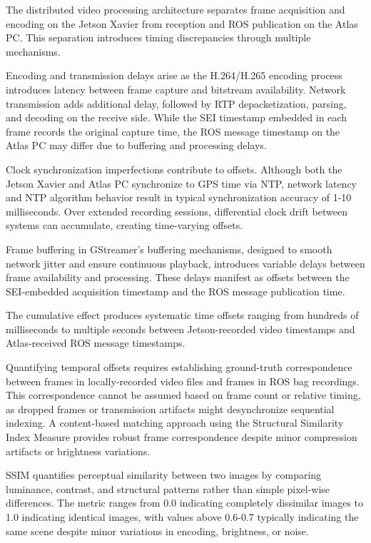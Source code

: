 \documentclass{erauthesis}
\begin{document}

The distributed video processing architecture separates frame acquisition and encoding on the Jetson Xavier from reception and ROS publication on the Atlas PC.
This separation introduces timing discrepancies through multiple mechanisms.

Encoding and transmission delays arise as the H.264/H.265 encoding process introduces latency between frame capture and bitstream availability.
Network transmission adds additional delay, followed by RTP depacketization, parsing, and decoding on the receive side.
While the SEI timestamp embedded in each frame records the original capture time, the ROS message timestamp on the Atlas PC may differ due to buffering and processing delays.

Clock synchronization imperfections contribute to offsets.
Although both the Jetson Xavier and Atlas PC synchronize to GPS time via NTP, network latency and NTP algorithm behavior result in typical synchronization accuracy of 1-10 milliseconds.
Over extended recording sessions, differential clock drift between systems can accumulate, creating time-varying offsets.

Frame buffering in GStreamer's buffering mechanisms, designed to smooth network jitter and ensure continuous playback, introduces variable delays between frame availability and processing.
These delays manifest as offsets between the SEI-embedded acquisition timestamp and the ROS message publication time.

The cumulative effect produces systematic time offsets ranging from hundreds of milliseconds to multiple seconds between Jetson-recorded video timestamps and Atlas-received ROS message timestamps.


Quantifying temporal offsets requires establishing ground-truth correspondence between frames in locally-recorded video files and frames in ROS bag recordings.
This correspondence cannot be assumed based on frame count or relative timing, as dropped frames or transmission artifacts might desynchronize sequential indexing.
A content-based matching approach using the Structural Similarity Index Measure provides robust frame correspondence despite minor compression artifacts or brightness variations.


SSIM quantifies perceptual similarity between two images by comparing luminance, contrast, and structural patterns rather than simple pixel-wise differences.
The metric ranges from 0.0 indicating completely dissimilar images to 1.0 indicating identical images, with values above 0.6-0.7 typically indicating the same scene despite minor variations in encoding, brightness, or noise.
\end{document}
